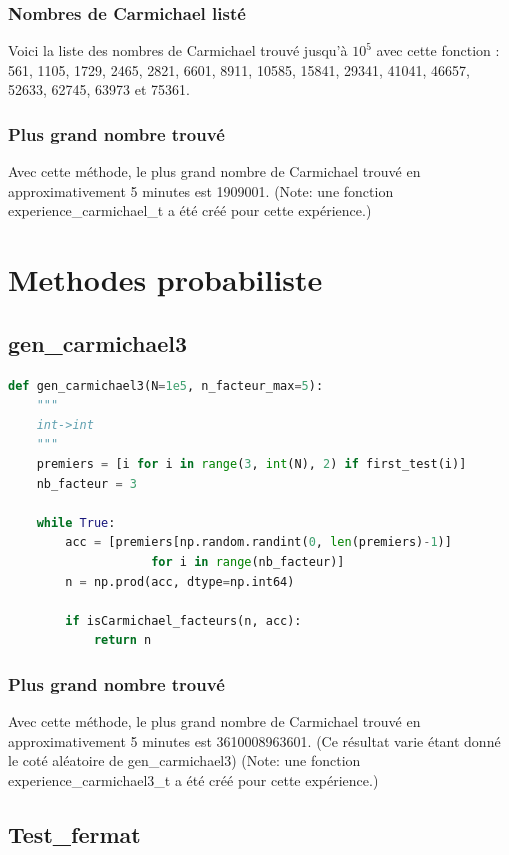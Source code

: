 \documentclass{article}
\begin{document}
\subsubsection{Nombres de Carmichael listé}
Voici la liste des nombres de Carmichael trouvé jusqu'à $10^5$ avec cette fonction : 561, 1105, 1729, 2465, 2821, 6601, 8911, 10585, 15841, 29341, 41041, 46657, 52633, 62745, 63973 et 75361.

\subsubsection{Plus grand nombre trouvé}
Avec cette méthode, le plus grand nombre de Carmichael trouvé en approximativement 5 minutes est 1909001.
(Note: une fonction experience\_carmichael\_t a été créé pour cette expérience.)

\section{Methodes probabiliste}
\subsection{gen\_carmichael3}

\begin{lstlisting}[language=Python, caption=gen\_carmichael3]
def gen_carmichael3(N=1e5, n_facteur_max=5):
    """
    int->int
    """
    premiers = [i for i in range(3, int(N), 2) if first_test(i)]
    nb_facteur = 3

    while True:
        acc = [premiers[np.random.randint(0, len(premiers)-1)]
                    for i in range(nb_facteur)]
        n = np.prod(acc, dtype=np.int64)

        if isCarmichael_facteurs(n, acc):
            return n
\end{lstlisting}

\subsubsection{Plus grand nombre trouvé}
Avec cette méthode, le plus grand nombre de Carmichael trouvé en approximativement 5 minutes est 3610008963601. (Ce résultat varie étant donné le coté aléatoire de gen\_carmichael3)
(Note: une fonction experience\_carmichael3\_t a été créé pour cette expérience.)


\subsection{Test\_fermat}
\end{document}
